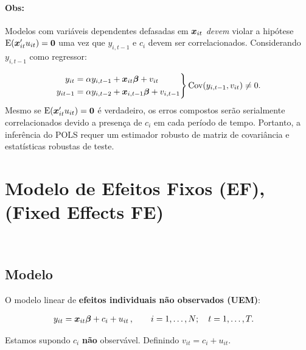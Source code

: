 \documentclass[11pt, oneside, a4paper, article]{article}
\numberwithin{equation}{section}
\begin{document}
\paragraph{Obs:}
Modelos com variáveis dependentes defasadas em $\boldsymbol{x}_{it}$ \textit{devem} violar a hipótese $\text{E}(\boldsymbol{x}_{it}'u_{it} ) = \boldsymbol{0}$ uma vez que $y_{i, t-1}$ e $c_{i}$ devem ser correlacionados.
Considerando $y_{i, t-1}$ como regressor:

\vspace{-1 em}
\begin{align*}
\left.
\begin{aligned}
	y_{it} &= \alpha y_{i, t-1} + \boldsymbol{x}_{it} \boldsymbol{\beta} + v_{it}
	\\
	y_{it-1} &= \alpha y_{i, t-2} + \boldsymbol{x}_{i,t-1} \boldsymbol{\beta} + v_{i,t-1}
\end{aligned}
\right\}
\text{Cov}(y_{i, t-1}, v_{it}) \neq 0.
\end{align*}
Mesmo se $\text{E}(\boldsymbol{x}_{it}'u_{it} ) = \boldsymbol{0}$  é verdadeiro, os erros compostos serão serialmente correlacionados devido a presença de $c_{i}$ em cada período de tempo.
Portanto, a inferência do POLS requer um estimador robusto de matriz de covariância e estatísticas robustas de teste.

\clearpage
\section{Modelo de Efeitos Fixos (EF), (Fixed Effects FE)}

\noindent
\citet[Sec.10.5 -- Fixed Effects Methods, p.265]{wool-2010} \\

\subsection{Modelo}

O modelo linear de \textbf{efeitos individuais não observados (UEM)}:

\vspace{-1 em}
\begin{align} \label{fe:mod:1}
	y_{it} &= \boldsymbol{x}_{it} \boldsymbol{\beta} + c_{i} + u_{it} 
	\, , \qquad	i = 1, \dots, N; \quad t = 1, \dots, T.
\end{align}

\noindent
Estamos supondo $c_{i}$ \textbf{não} observável.
Definindo $v_{it} = c_{i} + u_{it}$.
\end{document}
